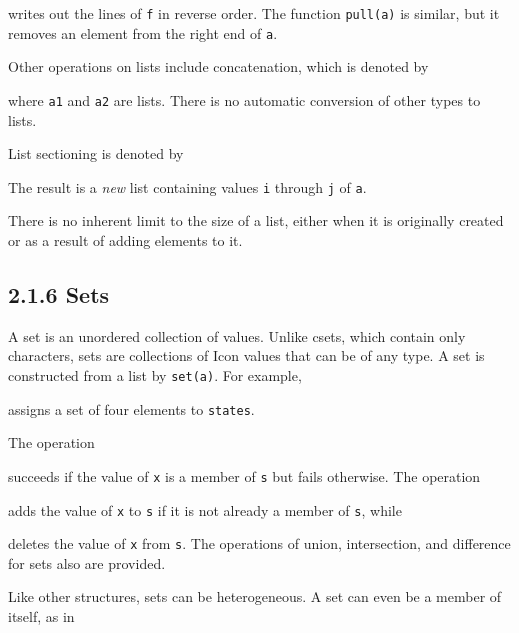 \noindent writes out the lines of \texttt{f} in reverse order. The
function \texttt{pull(a)} is similar, but it removes an element from
the right end of \texttt{a}.

Other operations on lists include concatenation, which is denoted by


\noindent where \texttt{a1} and \texttt{a2} are lists. There is no
automatic conversion of other types to lists.

List sectioning is denoted by


The result is a \textit{new} list containing values \texttt{i} through
\texttt{j} of \texttt{a}.

There is no inherent limit to the size of a list, either when it is
originally created or as a result of adding elements to it.


\subsection[2.1.6 Sets]{2.1.6 Sets}

A set is an unordered collection of values. Unlike csets, which
contain only characters, sets are collections of Icon values that can
be of any type. A set is constructed from a list by
\texttt{set(a)}. For example,


\noindent
assigns a set of four elements to \texttt{states}.

The operation


\noindent
succeeds if the value of \texttt{x} is a member of \texttt{s} but
fails otherwise. The operation


\noindent
adds the value of \texttt{x} to \texttt{s} if it is not already a
member of \texttt{s}, while


\noindent
deletes the value of \texttt{x} from \texttt{s}. The operations of
union, intersection, and difference for sets also are provided.

Like other structures, sets can be heterogeneous. A set can even be a
member of itself, as in


